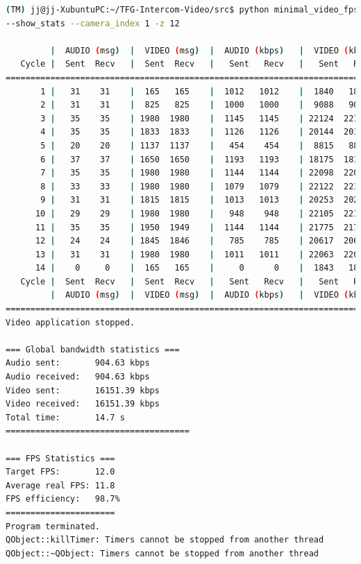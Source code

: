 \begin{lstlisting}[language=bash,basicstyle=\ttfamily\tiny]
(TM) jj@jj-XubuntuPC:~/TFG-Intercom-Video/src$ python minimal_video_fps.py --show_video 
--show_stats --camera_index 1 -z 12

         |  AUDIO (msg)  |  VIDEO (msg)  |  AUDIO (kbps)   |  VIDEO (kbps)   |     CPU (%) 
   Cycle |  Sent  Recv   |  Sent  Recv   |   Sent   Recv   |   Sent   Recv   | Program System
================================================================================================
       1 |   31    31    |  165   165    |  1012   1012    |  1840   1840    |  13      0       
       2 |   31    31    |  825   825    |  1000   1000    |  9088   9088    |  44     76       
       3 |   35    35    | 1980  1980    |  1145   1145    | 22124  22124    |  45     63       
       4 |   35    35    | 1833  1833    |  1126   1126    | 20144  20144    |  46     61       
       5 |   20    20    | 1137  1137    |   454    454    |  8815   8815    |  41     22       
       6 |   37    37    | 1650  1650    |  1193   1193    | 18175  18175    |  45     70       
       7 |   35    35    | 1980  1980    |  1144   1144    | 22098  22098    |  43     70       
       8 |   33    33    | 1980  1980    |  1079   1079    | 22122  22122    |  49     59       
       9 |   31    31    | 1815  1815    |  1013   1013    | 20253  20253    |  54     71       
      10 |   29    29    | 1980  1980    |   948    948    | 22105  22105    |  48     69       
      11 |   35    35    | 1950  1949    |  1144   1144    | 21775  21764    |  46     70       
      12 |   24    24    | 1845  1846    |   785    785    | 20617  20628    |  46     66       
      13 |   31    31    | 1980  1980    |  1011   1011    | 22063  22063    |  44     67       
      14 |    0     0    |  165   165    |     0      0    |  1843   1843    |   1     19       
   Cycle |  Sent  Recv   |  Sent  Recv   |   Sent   Recv   |   Sent   Recv   | Program System
         |  AUDIO (msg)  |  VIDEO (msg)  |  AUDIO (kbps)   |  VIDEO (kbps)   |     CPU (%) 
===========================================================================================
Video application stopped.

=== Global bandwidth statistics ===
Audio sent:       904.63 kbps
Audio received:   904.63 kbps
Video sent:       16151.39 kbps
Video received:   16151.39 kbps
Total time:       14.7 s
=====================================

=== FPS Statistics ===
Target FPS:       12.0
Average real FPS: 11.8
FPS efficiency:   98.7%
======================
Program terminated.
QObject::killTimer: Timers cannot be stopped from another thread
QObject::~QObject: Timers cannot be stopped from another thread
\end{lstlisting}

